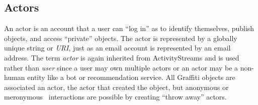 
\subsection{Actors}
\label{concepts:actors}

An actor is an account that a user can ``log in'' as
to identify themselves, publish objects, and access ``private'' objects.
The actor is represented by a globally unique string or \emph{URI},
just as an email account is represented by an email address.
The term \emph{actor} is again inherited from ActivityStreams
and is used rather than \emph{user} since a user may own
multiple actors or
an actor may be a non-human entity
like a bot or recommendation service.
All Graffiti objects are associated an actor, the actor
that created the object, but anonymous
or meronymous~\cite{meronymous} interactions are possible by
creating ``throw away'' actors.



